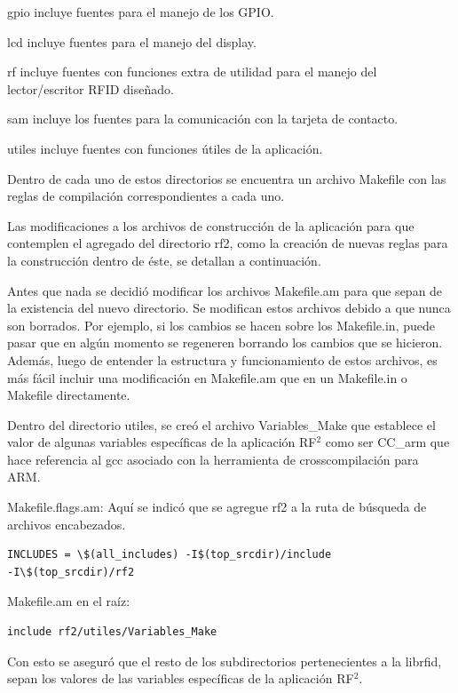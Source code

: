 gpio incluye fuentes para el manejo de los GPIO.

lcd incluye fuentes para el manejo del display.

rf incluye fuentes con funciones extra de utilidad para el manejo del lector/escritor RFID diseñado.

sam incluye los fuentes para la comunicación con la tarjeta de contacto.

utiles incluye fuentes con funciones útiles de la aplicación.

\bigskip
Dentro de cada uno de estos directorios se encuentra un archivo Makefile con las reglas de compilación correspondientes a cada uno.

\bigskip
Las modificaciones a los archivos de construcción de la aplicación para que contemplen el agregado del directorio rf2, como la creación de nuevas reglas para la construcción dentro de éste, se detallan a continuación.

\bigskip
Antes que nada se decidió modificar los archivos Makefile.am para que sepan de la existencia del nuevo directorio. Se modifican estos archivos debido a que nunca son borrados. Por ejemplo, si los cambios se hacen sobre los Makefile.in, puede pasar que en algún momento se regeneren borrando los cambios que se hicieron. Además, luego de entender la estructura y funcionamiento de estos archivos, es más fácil incluir una modificación en Makefile.am que en un Makefile.in o Makefile directamente.

Dentro del directorio utiles, se creó el archivo Variables\_Make que establece el valor de algunas variables específicas de la aplicación RF$^{2}$ como ser CC\_arm que hace referencia al gcc asociado con la herramienta de crosscompilación para ARM. 

\bigskip
Makefile.flags.am:
Aquí se indicó que se agregue rf2 a la ruta de búsqueda de archivos encabezados.

\begin{verbatim}
INCLUDES = \$(all_includes) -I$(top_srcdir)/include 
-I\$(top_srcdir)/rf2
\end{verbatim}

Makefile.am en el raíz:

\begin{verbatim}
include rf2/utiles/Variables_Make
\end{verbatim}
Con esto se aseguró que el resto de los subdirectorios pertenecientes a la librfid, sepan los valores de las variables específicas de la aplicación RF$^{2}$.

